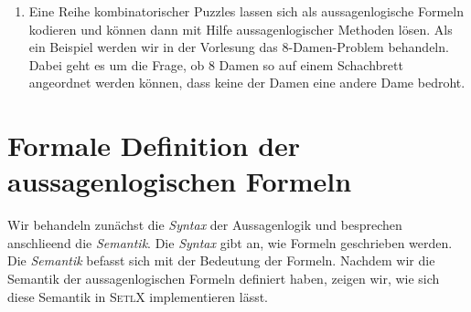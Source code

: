 \begin{enumerate}
      Bei einem gr\"{o}\3eren Bahnhof gibt es einige hundert Weichen und Signale, die st\"{a}ndig
      neu eingestellt werden m\"{u}ssen, um sogenannte \emph{Fahrstra\3en} f\"{u}r die Z\"{u}ge zu
      realisieren.  Verschiedene Fahrstra\3en d\"{u}rfen sich aus Sicherheitsgr\"{u}nden nicht kreuzen.  
      Die einzelnen Fahrstra\3en werden durch sogenannte \emph{Verschlusspl\"{a}ne} beschrieben.
      Die Korrektheit solcher Verschlusspl\"{a}ne kann durch aussagenlogische Formeln ausgedr\"{u}ckt werden.
\item Eine Reihe kombinatorischer Puzzles lassen sich als aussagenlogische Formeln
      kodieren und k\"{o}nnen dann mit Hilfe aussagenlogischer Methoden l\"{o}sen.  Als ein
      Beispiel werden wir in der Vorlesung das 8-Damen-Problem behandeln.  Dabei geht es um die Frage,
      ob 8 Damen so auf einem Schachbrett angeordnet werden k\"{o}nnen, dass keine der Damen
      eine andere Dame bedroht.
\end{enumerate}

\section{Formale Definition der aussagenlogischen Formeln}
Wir behandeln zun\"{a}chst die \emph{Syntax} der Aussagenlogik und besprechen anschlie\3end die
\emph{Semantik}.  Die \textsl{Syntax} gibt an, wie Formeln geschrieben werden.
Die \emph{Semantik} befasst sich mit der Bedeutung der Formeln.
Nachdem wir die Semantik der aussagenlogischen Formeln definiert haben, zeigen wir,
wie sich diese Semantik in \textsc{SetlX} implementieren l\"{a}sst.

